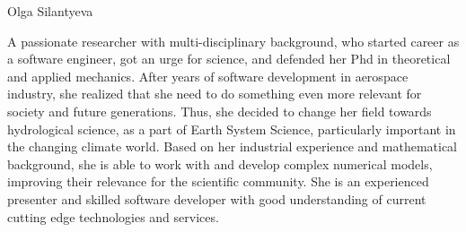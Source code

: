 \begin{participant}[gender=female]{Olga Silantyeva}






  \medskip A passionate researcher with multi-disciplinary background, who started career as a software engineer, got an urge for science, and defended her Phd in theoretical and applied mechanics. After years of software development in aerospace industry, she realized that she need to do something even more relevant for society and future generations. Thus, she decided to change her field towards hydrological science, as a part of Earth System Science, particularly important in the changing climate world. Based on her industrial experience and mathematical background, she is able to work with and develop complex numerical models, improving their relevance for the scientific community. She is an experienced presenter and skilled software developer with good understanding of current cutting edge technologies and services.   
\end{participant}

